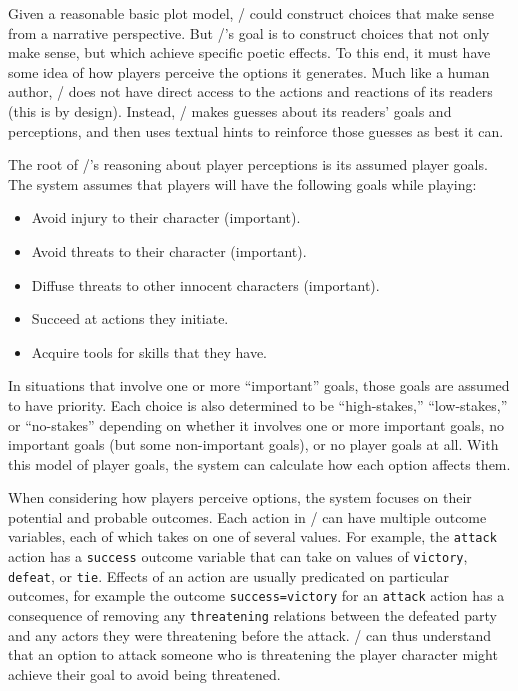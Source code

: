 Given a reasonable basic plot model, \dunyazad/ could construct choices that make sense from a narrative perspective.
%
But \dunyazad/'s goal is to construct choices that not only make sense, but which achieve specific poetic effects.
%
To this end, it must have some idea of how players perceive the options it generates.
%
Much like a human author, \dunyazad/ does not have direct access to the actions and reactions of its readers (this is by design).
%
Instead, \dunyazad/ makes guesses about its readers' goals and perceptions, and then uses textual hints to reinforce those guesses as best it can.


The root of \dunyazad/'s reasoning about player perceptions is its assumed player goals.
%
The system assumes that players will have the following goals while playing:
%
\begin{itemize}
  \item Avoid injury to their character (important).
  \item Avoid threats to their character (important).
  \item Diffuse threats to other innocent characters (important).
  \item Succeed at actions they initiate.
  \item Acquire tools for skills that they have.
\end{itemize}
%
In situations that involve one or more ``important'' goals, those goals are assumed to have priority.
%
Each choice is also determined to be ``high-stakes,''  ``low-stakes,'' or ``no-stakes'' depending on whether it involves one or more important goals, no important goals (but some non-important goals), or no player goals at all.
%
With this model of player goals, the system can calculate how each option affects them.


When considering how players perceive options, the system focuses on their potential and probable outcomes.
%
Each action in \dunyazad/ can have multiple outcome variables, each of which takes on one of several values.
%
For example, the \texttt{attack} action has a \texttt{success} outcome variable that can take on values of \texttt{victory}, \texttt{defeat}, or \texttt{tie}.
%
Effects of an action are usually predicated on particular outcomes, for example the outcome \texttt{success=victory} for an \texttt{attack} action has a consequence of removing any \texttt{threatening} relations between the defeated party and any actors they were threatening before the attack.
%
\dunyazad/ can thus understand that an option to attack someone who is threatening the player character might achieve their goal to avoid being threatened.


